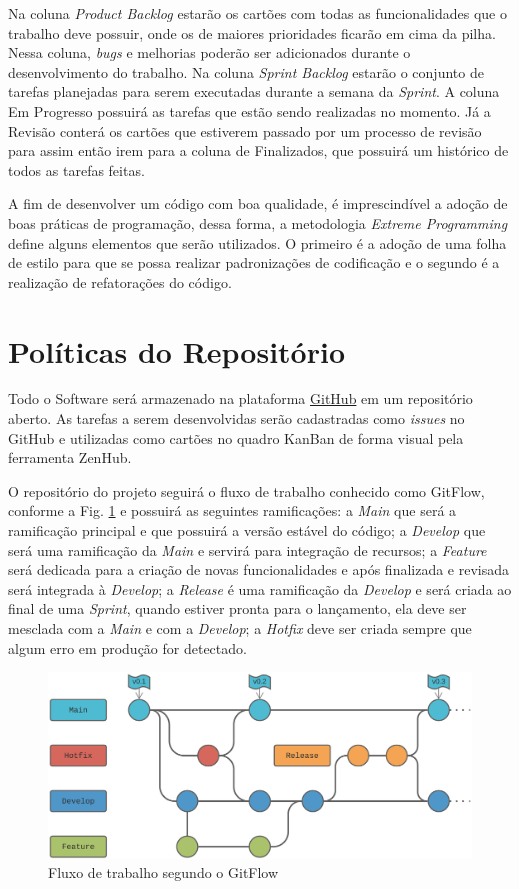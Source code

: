Na coluna \textit{Product Backlog} estarão os cartões com todas as funcionalidades que o trabalho deve possuir, onde os de maiores prioridades ficarão em cima da pilha. Nessa coluna, \textit{bugs} e melhorias poderão ser adicionados durante o desenvolvimento do trabalho. Na coluna \textit{Sprint Backlog} estarão o conjunto de tarefas planejadas para serem executadas durante a semana da \textit{Sprint}. A coluna Em Progresso possuirá as tarefas que estão sendo realizadas no momento. Já a Revisão conterá os cartões que estiverem passado por um processo de revisão para assim então irem para a coluna de Finalizados, que possuirá um histórico de todos as tarefas feitas.

A fim de desenvolver um código com boa qualidade, é imprescindível a adoção de boas práticas de programação, dessa forma, a metodologia \textit{Extreme Programming} define alguns elementos que serão utilizados. O primeiro é a adoção de uma folha de estilo para que se possa realizar padronizações de codificação e o segundo é a realização de refatorações do código.

\section{Políticas do Repositório}

Todo o Software será armazenado na plataforma \href{https://github.com/}{GitHub} em um repositório aberto. As tarefas a serem desenvolvidas serão cadastradas como \textit{issues} no GitHub e utilizadas como cartões no quadro KanBan de forma visual pela ferramenta ZenHub.

O repositório do projeto seguirá o fluxo de trabalho conhecido como GitFlow, conforme a Fig. \ref{gitflow} e possuirá as seguintes ramificações: a \textit{Main} que será a ramificação principal e que possuirá a versão estável do código; a \textit{Develop} que será uma ramificação da \textit{Main} e servirá para integração de recursos; a \textit{Feature} será dedicada para a criação de novas funcionalidades e após finalizada e revisada será integrada à \textit{Develop}; a \textit{Release} é uma ramificação da \textit{Develop} e será criada ao final de uma \textit{Sprint}, quando estiver pronta para o lançamento, ela deve ser mesclada com a \textit{Main} e com a \textit{Develop}; a \textit{Hotfix} deve ser criada sempre que algum erro em produção for detectado.  

\begin{figure}[h]
	\centering
	\includegraphics[keepaspectratio=true,scale=0.18]{figuras/git flow.png}
	\caption{Fluxo de trabalho segundo o GitFlow}
	\label{gitflow}
\end{figure}

